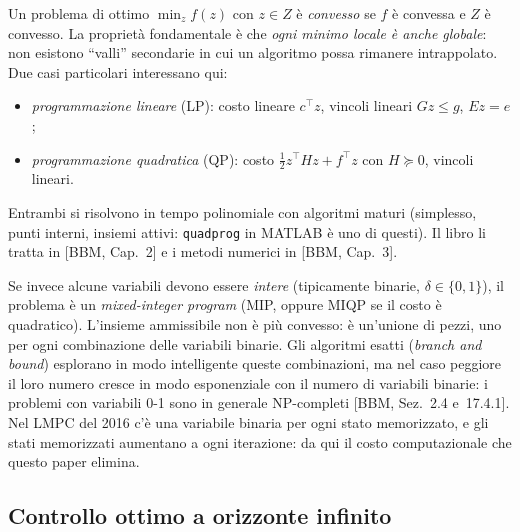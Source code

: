 \documentclass[11pt,a4paper]{article}
\theoremstyle{definition}
\theoremstyle{plain}
\theoremstyle{remark}
\newcommand{\libro}[1]{\textup{[BBM, #1]}} %
\begin{document}
Un problema di ottimo $\min_z f(z)$ con $z\in Z$ è \emph{convesso} se $f$ è
convessa e $Z$ è convesso. La proprietà fondamentale è che \emph{ogni minimo
locale è anche globale}: non esistono ``valli'' secondarie in cui un
algoritmo possa rimanere intrappolato. Due casi particolari interessano qui:
\begin{itemize}
  \item \emph{programmazione lineare} (LP): costo lineare $c^\top z$, vincoli
        lineari $Gz\le g$, $Ez=e$;
  \item \emph{programmazione quadratica} (QP): costo
        $\tfrac12 z^\top H z + f^\top z$ con $H\succeq 0$, vincoli lineari.
\end{itemize}
Entrambi si risolvono in tempo polinomiale con algoritmi maturi (simplesso,
punti interni, insiemi attivi: \texttt{quadprog} in MATLAB è uno di questi).
Il libro li tratta in \libro{Cap.~2} e i metodi numerici in \libro{Cap.~3}.

Se invece alcune variabili devono essere \emph{intere} (tipicamente binarie,
$\delta\in\{0,1\}$), il problema è un \emph{mixed-integer program} (MIP,
oppure MIQP se il costo è quadratico). L'insieme ammissibile non è più
convesso: è un'unione di pezzi, uno per ogni combinazione delle variabili
binarie. Gli algoritmi esatti (\emph{branch and bound}) esplorano in modo
intelligente queste combinazioni, ma nel caso peggiore il loro numero cresce
in modo esponenziale con il numero di variabili binarie: i problemi con
variabili 0-1 sono in generale NP-completi \libro{Sez.~2.4 e~17.4.1}. Nel LMPC del 2016
c'è una variabile binaria per ogni stato memorizzato, e gli stati memorizzati
aumentano a ogni iterazione: da qui il costo computazionale che questo paper
elimina.

\subsection{Controllo ottimo a orizzonte infinito}\label{sec:ottimo-infinito}
\end{document}
